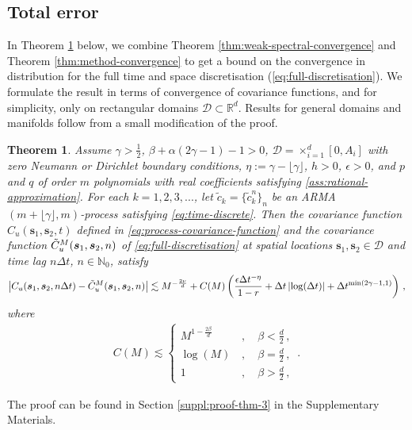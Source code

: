 \documentclass[12pt]{article} %
\newcommand{\abs}[1]{\left| #1 \right|}
\newtheorem{theorem}{Theorem}
\begin{document}
\subsection{Total error}

In Theorem \ref{thm:full-convergence} below, we combine Theorem \ref{thm:weak-spectral-convergence} and Theorem \ref{thm:method-convergence} to get a bound on the convergence in distribution for the full time and space discretisation (\ref{eq:full-discretisation}). We formulate the result in terms of convergence of covariance functions, and for simplicity, only on rectangular domains $\mathcal{D} \subset \mathbb{R}^d$. Results for general domains and manifolds follow from a small modification of the proof. 

\begin{theorem} \label{thm:full-convergence} Assume $\gamma>\tfrac12$, $\beta + \alpha (2 \gamma - 1) - 1 > 0$, $\mathcal{D} = \times_{i = 1}^d [0, A_i]$ with zero Neumann or Dirichlet boundary conditions,  $\eta := \gamma - \lfloor \gamma \rfloor$, $h>0$, $\epsilon > 0$, and $p$ and $q$ of order $m$ polynomials with real coefficients satisfying \eqref{ass:rational-approximation}.
For each $k = 1,2,3,...$, let $\tilde{c}_k = \{\tilde{c}_k^n\}_n$ be an ARMA$(m + \lfloor \gamma \rfloor, m)$-process satisfying \eqref{eq:time-discrete}. Then the covariance function $C_{u}(\boldsymbol{s}_1, \boldsymbol{s}_2, t)$ defined in \eqref{eq:process-covariance-function} and the covariance function $\Tilde{C}^M_{u}(\boldsymbol{s}_1, \boldsymbol{s}_2, n)$ of \eqref{eq:full-discretisation} at spatial locations $\mathbf{s}_1, \mathbf{s}_2 \in \mathcal{D}$ and time lag $%
n \Delta t$, $n \in \mathbb{N}_0$, satisfy
\begin{equation*}
    \left|C_{u}(\boldsymbol{s}_1, \boldsymbol{s}_2, n \Delta t) - \Tilde{C}^M_{u}(\boldsymbol{s}_1, \boldsymbol{s}_2, n) \right| \lesssim M^{-\frac{2 \nu}{d}} + C(M) \left( \frac{\epsilon \Delta t^{-\eta}}{1 - r} + \Delta t \abs{\log(\Delta t)} + \Delta t^{\min(2\gamma - 1, 1)} \right)\, ,
\end{equation*}
where 
\begin{align*}
    C(M) \lesssim \begin{cases}
        M^{1 - \frac{2 \beta}{d}} \, & , \quad \beta < \frac{d}{2} \, , \\
        \log(M)  \, & , \quad \beta = \frac{d}{2} \, , \\
        1  \, & , \quad  \beta > \frac{d}{2} \, ,
    \end{cases} \, .
\end{align*}
\end{theorem}
The proof can be found in Section \ref{suppl:proof-thm-3} in the Supplementary Materials. 
\end{document}
